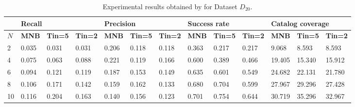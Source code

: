 \begin{table*}[]
	\small
	\caption{Experimental results obtained by \TFb for Dataset $D_{20}$.}
	\begin{tabular}{|l | lll| lll |lll |lll|}
		\hline
		& \multicolumn{3}{l|}{\textbf{Recall}} & \multicolumn{3}{l|}{\textbf{Precision}} & \multicolumn{3}{l|}{\textbf{Success rate}} & \multicolumn{3}{l|}{ \textbf{Catalog coverage}} \\ \hline
		$N$  & \textbf{MNB}     & \textbf{Tin=5}   & \textbf{Tin=2}  & \textbf{MNB}      & \textbf{Tin=5 }   & \textbf{Tin=2}   & \textbf{MNB}       & \textbf{Tin=5 }   & \textbf{Tin=2}    & \textbf{MNB}        & \textbf{Tin=5 }     & \textbf{Tin=2}      \\ \hline
		2  & 0.035   & 0.031   & 0.031  & 0.206    & 0.118    & 0.118   & 0.363     & 0.217    & 0.217    & 9.068     & 8.593      & 8.593      \\ \hline
		4  & 0.075   & 0.063   & 0.088  & 0.221   & 0.119    & 0.166   &  0.600     & 0.389    & 0.466    & 19.405     & 15.340     & 15.912     \\ \hline
		6  & 0.094   & 0.121   & 0.119  & 0.187    & 0.153    & 0.149   & 0.635    & 0.601    & 0.549    &  24.682     & 22.131     & 21.780     \\ \hline
		\rowcolor{Gray}
		8  & 0.106   & 0.171   & 0.142  & 0.159  & 0.162    & 0.133   &  0.680     & 0.704    & 0.599    & 27.967     & 29.296     & 27.428     \\ \hline
		10 & 0.116   & 0.204   & 0.163  & 0.140    & 0.156    & 0.123   & 0.701     & 0.754    & 0.644    & 30.719     & 35.296     & 32.967     \\ \hline

\end{tabular}
\end{table*}
